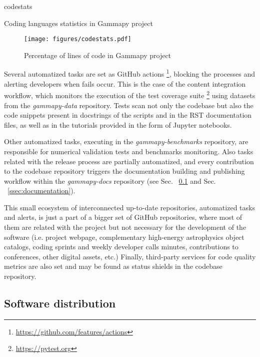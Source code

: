 \begin{table}
	{codestats}
	\caption{Coding languages statistics in Gammapy project}
	\label{table:codestats:data}
\end{table}

\begin{figure}[t]
	\centering
	\texttt{[image: figures/codestats.pdf]}
	\caption{
		Percentage of lines of code in Gammapy project} \label{fig:codestats:lang}
\end{figure}

Several automatized tasks are set as GitHub actions \footnote{\url{https://github.com/features/actions}}, blocking the processes and alerting developers when fails occur. This is the case of the content integration workflow, which monitors the execution of the test coverage suite \footnote{\url{https://pytest.org}} using datasets from the \textit{gammapy-data} repository. Tests scan not only the codebase but also the code snippets present in docstrings of the scripts and in the RST documentation files, as well as in the tutorials provided in the form of Jupyter notebooks. 

Other automatized tasks, executing in the \textit{gammapy-benchmarks} repository, are responsible for numerical validation tests and benchmarks monitoring. Also tasks related with the release process are partially automatized, and every contribution to the codebase repository triggers the documentation building and publishing workflow within the \textit{gammapy-docs} repository (see Sec. ~\ref{ssec:software-distribution} and Sec. ~\ref{ssec:documentation}).

This small ecosystem of interconnected up-to-date repositories, automatized tasks and alerts, is just a part of a bigger set of GitHub repositories, where most of them are related with the project but not necessary for the development of the software (i.e. project webpage, complementary high-energy astrophysics object catalogs, coding sprints and weekly developer calls minutes, contributions to conferences, other digital assets, etc.) Finally, third-party services for code quality metrics are also set and may be found as status shields in the codebase repository.

\subsection{Software distribution}
\label{ssec:software-distribution}


